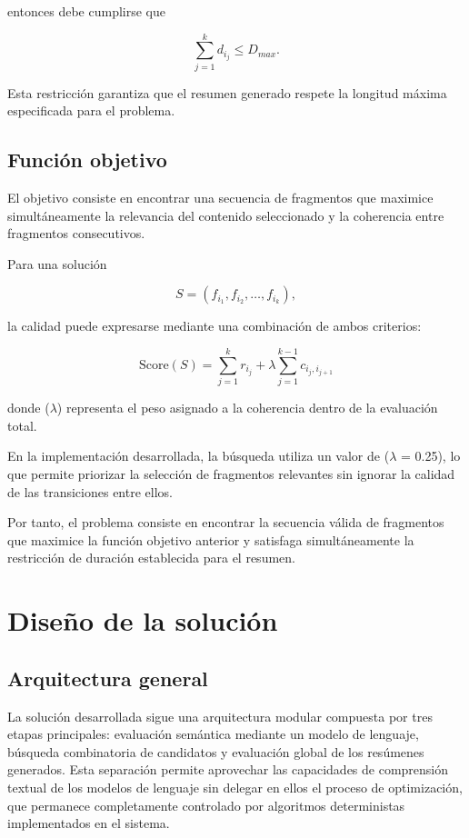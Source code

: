 \documentclass[12pt,a4paper]{article}
\begin{document}
entonces debe cumplirse que

\[
\sum_{j=1}^{k} d_{i_j}
\leq
D_{max}.
\]

Esta restricción garantiza que el resumen generado respete la longitud máxima especificada para el problema.

\subsection{Función objetivo}

El objetivo consiste en encontrar una secuencia de fragmentos que maximice simultáneamente la relevancia del contenido seleccionado y la coherencia entre fragmentos consecutivos.

Para una solución

\[
S=(f_{i_1},f_{i_2},\ldots,f_{i_k}),
\]

la calidad puede expresarse mediante una combinación de ambos criterios:

\begin{equation}
\mathrm{Score}(S) =
\sum_{j=1}^{k} r_{i_j}
+
\lambda
\sum_{j=1}^{k-1}
c_{i_j,i_{j+1}}
\end{equation}

donde ($\lambda$) representa el peso asignado a la coherencia dentro de la evaluación total.

En la implementación desarrollada, la búsqueda utiliza un valor de ($\lambda$ = 0.25), lo que permite priorizar la selección de fragmentos relevantes sin ignorar la calidad de las transiciones entre ellos.

Por tanto, el problema consiste en encontrar la secuencia válida de fragmentos que maximice la función objetivo anterior y satisfaga simultáneamente la restricción de duración establecida para el resumen.



\section{Diseño de la solución}

\subsection{Arquitectura general}

La solución desarrollada sigue una arquitectura modular compuesta por tres etapas principales: evaluación semántica mediante un modelo de lenguaje, búsqueda combinatoria de candidatos y evaluación global de los resúmenes generados. Esta separación permite aprovechar las capacidades de comprensión textual de los modelos de lenguaje sin delegar en ellos el proceso de optimización, que permanece completamente controlado por algoritmos deterministas implementados en el sistema.
\end{document}
